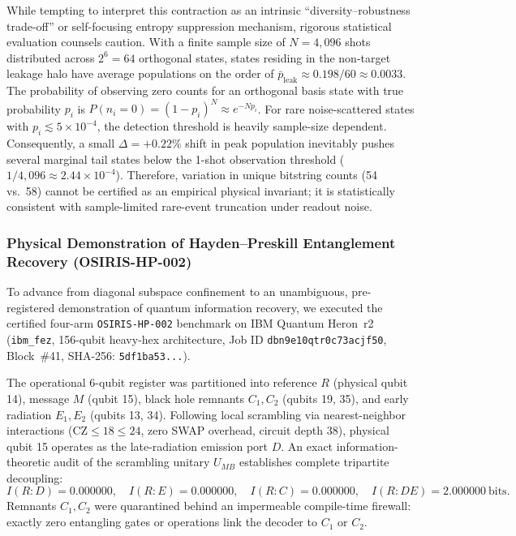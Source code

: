 \documentclass[aps,preprint,superscriptaddress,longbibliography]{revtex4-2}
\begin{document}
While tempting to interpret this contraction as an intrinsic ``diversity--robustness trade-off'' or self-focusing entropy suppression mechanism, rigorous statistical evaluation counsels caution. With a finite sample size of $N = 4{,}096$ shots distributed across $2^6 = 64$ orthogonal states, states residing in the non-target leakage halo have average populations on the order of $\bar{p}_{\mathrm{leak}} \approx 0.198 / 60 \approx 0.0033$. The probability of observing zero counts for an orthogonal basis state with true probability $p_i$ is $P(n_i = 0) = (1 - p_i)^N \approx e^{-N p_i}$. For rare noise-scattered states with $p_i \lesssim 5 \times 10^{-4}$, the detection threshold is heavily sample-size dependent. Consequently, a small $\Delta = +0.22\%$ shift in peak population inevitably pushes several marginal tail states below the 1-shot observation threshold ($1/4{,}096 \approx 2.44 \times 10^{-4}$). Therefore, variation in unique bitstring counts (54 vs.\ 58) cannot be certified as an empirical physical invariant; it is statistically consistent with sample-limited rare-event truncation under readout noise.

\subsubsection{Physical Demonstration of Hayden--Preskill Entanglement Recovery (OSIRIS-HP-002)}
\label{sec:hp_three_arm}

To advance from diagonal subspace confinement to an unambiguous, pre-registered demonstration of quantum information recovery, we executed the certified four-arm \texttt{OSIRIS-HP-002} benchmark on IBM Quantum Heron~r2 (\texttt{ibm\_fez}, 156-qubit heavy-hex architecture, Job ID \texttt{dbn9e10qtr0c73acjf50}, Block~\#41, SHA-256: \texttt{5df1ba53...}). 

The operational 6-qubit register was partitioned into reference $R$ (physical qubit 14), message $M$ (qubit 15), black hole remnants $C_1, C_2$ (qubits 19, 35), and early radiation $E_1, E_2$ (qubits 13, 34). Following local scrambling via nearest-neighbor interactions ($\text{CZ} \le 18 \le 24$, zero SWAP overhead, circuit depth 38), physical qubit 15 operates as the late-radiation emission port $D$. An exact information-theoretic audit of the scrambling unitary $U_{MB}$ establishes complete tripartite decoupling:
\begin{equation}
I(R : D) = 0.000000,\quad I(R : E) = 0.000000,\quad I(R : C) = 0.000000,\quad I(R : DE) = 2.000000\ \text{bits}.
\end{equation}
Remnants $C_1, C_2$ were quarantined behind an impermeable compile-time firewall: exactly zero entangling gates or operations link the decoder to $C_1$ or $C_2$.
\end{document}
